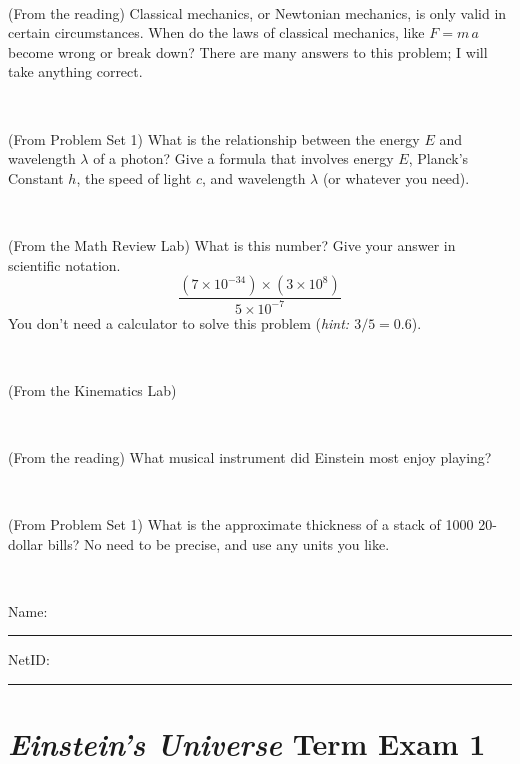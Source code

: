\documentclass[12pt, letterpaper]{article}
\begin{document}
\vfill ~

\begin{problem} (From the reading)
Classical mechanics, or Newtonian mechanics, is only valid in certain
circumstances. When do the laws of classical mechanics, like $F =
m\,a$ become wrong or break down? There are many answers to this
problem; I will take anything correct.
\end{problem}


\vfill ~

\begin{problem} (From Problem Set 1)
What is the relationship between the energy $E$ and wavelength
$\lambda$ of a photon? Give a formula that involves energy $E$,
Planck's Constant $h$, the speed of light $c$, and wavelength
$\lambda$ (or whatever you need).
\end{problem}

\vfill ~


\clearpage


\begin{problem} (From the Math Review Lab)
What is this number? Give your answer in scientific notation.
$$
\frac{(7\times10^{-34})\times(3\times10^8)}{5\times10^{-7}}
$$
You don't need a calculator to solve this problem (\textit{hint: $3/5=0.6$}).
\end{problem}


\vfill ~

\begin{problem} (From the Kinematics Lab)

\end{problem}


\vfill ~

\begin{problem} (From the reading)
What musical instrument did Einstein most enjoy playing?
\end{problem}


\vfill ~

\begin{problem} (From Problem Set 1)
What is the approximate thickness of a stack of 1000 20-dollar bills?
No need to be precise, and use any units you like.
\end{problem}


\vfill ~


\cleardoublepage



\noindent
Name: \rule[-1ex]{0.60\textwidth}{0.1pt}
NetID: \rule[-1ex]{0.20\textwidth}{0.1pt}

\section*{\textsl{Einstein's Universe} Term Exam 1}
\setcounter{problem}{1}
\end{document}
